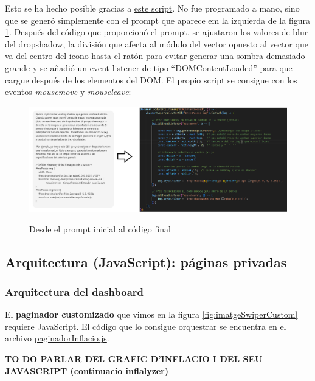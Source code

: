 \documentclass[a4paper,12pt]{report}
\begin{document}
	Esto se ha hecho posible gracias a  \href{https://github.com/blackcub3s/mercApp/blob/main/APP%20WEB/__frontend__produccio__/app/js/pas4/dropShadowReactiu.js}{este script}. No fue programado a mano, sino que se generó simplemente con el prompt que aparece em la izquierda de la figura \ref{fig:promptScriptDropShadow}. Después del código que proporcionó el prompt, se ajustaron los valores de blur del dropshadow, la división que afecta al módulo del vector opuesto al vector que va del centro del icono hasta el ratón para evitar generar una sombra demasiado grande y se añadió un event listener de tipo ``DOMContentLoaded'' para que cargue después de los elementos del DOM. El propio script se consigue con los eventos \textit{mousemove} y \textit{mouseleave}:
	
	\begin{figure}[H]
		\centering
		\caption{Desde el prompt inicial al código final}
		\includegraphics[width=1\linewidth]{img/promptScriptDropShadow}
		\label{fig:promptScriptDropShadow}
	\end{figure}
	
	
	\subsection{Arquitectura (JavaScript): páginas privadas}
	
	\subsubsection{Arquitectura del dashboard}
	\label{sec:paginadorJavascriptArquitectura}
	
	El \textbf{paginador customizado} que vimos en la figura \ref{fig:imatgeSwiperCustom} requiere JavaScript. El código que lo consigue orquestrar se encuentra en el archivo \href{https://github.com/blackcub3s/mercApp/blob/main/APP%20WEB/__frontend__produccio__/app/js/dashboard/paginadorInflacio.js}{paginadorInflacio.js}.
	
	\textbf{TO DO PARLAR DEL GRAFIC D'INFLACIO I DEL SEU JAVASCRIPT (continuacio inflalyzer)}
	
\end{document}

